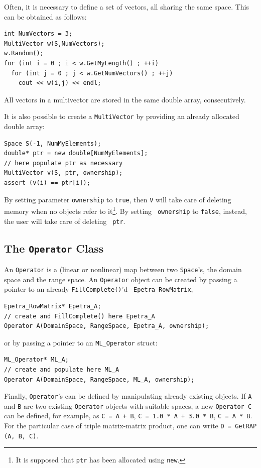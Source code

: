\documentclass{article}[11pt]
\begin{document}
\smallskip

Often, it is necessary to define a set of vectors, all sharing the same space.
This can be obtained as follows:
\begin{verbatim}
int NumVectors = 3;
MultiVector w(S,NumVectors);
w.Random();
for (int i = 0 ; i < w.GetMyLength() ; ++i)
  for (int j = 0 ; j < w.GetNumVectors() ; ++j)
    cout << w(i,j) << endl;
\end{verbatim}
All vectors in a multivector are stored in the same double array,
  consecutively.

\smallskip

It is also possible to create a {\tt MultiVector} by providing an already
allocated double array:
\begin{verbatim}
Space S(-1, NumMyElements);
double* ptr = new double[NumMyElements];
// here populate ptr as necessary
MultiVector v(S, ptr, ownership);
assert (v(i) == ptr[i]);
\end{verbatim} 
By setting parameter {\tt ownership} to {\tt true}, then {\tt V} will take
care of deleting memory when no objects refer to it\footnote{It is supposed
  that {\tt ptr} has been allocated using {\tt new}.}. By setting {\tt
  ownership} to {\tt false}, instead, the user will take care of deleting {\tt
    ptr}.

\subsection{The {\tt Operator} Class}
\label{sec:operator}

An {\tt Operator} is a (linear or nonlinear) map between two {\tt Space}'s, the
domain space and the range space. An {\tt Operator} object can be created
by passing a pointer to an already {\tt FillComplete()}'d {\tt
Epetra\_RowMatrix},
\begin{verbatim}
Epetra_RowMatrix* Epetra_A;
// create and FillComplete() here Epetra_A
Operator A(DomainSpace, RangeSpace, Epetra_A, ownership);
\end{verbatim}
or by passing a pointer to an {\tt ML\_Operator} struct:
\begin{verbatim}
ML_Operator* ML_A;
// create and populate here ML_A
Operator A(DomainSpace, RangeSpace, ML_A, ownership);
\end{verbatim}
Finally, {\tt Operator}'s can be defined 
by manipulating already existing objects. If {\tt A} and {\tt B} are two
existing {\tt Operator} objects with suitable spaces, a new {\tt Operator C}
can be defined, for example, as {\tt C = A
+ B}, {\tt C = 1.0 * A + 3.0 * B}, {\tt C = A * B}. For the particular case of
triple matrix-matrix product, one can write {\tt D = GetRAP (A, B, C)}.
%
\end{document}
